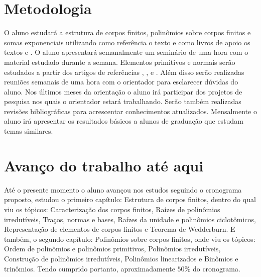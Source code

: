 \documentclass[12pt,twoside]{article}
\begin{document}

  \section*{Metodologia}
    O aluno estudará a estrutura de corpos finitos, polinômios sobre corpos finitos e somas
    exponenciais utilizando como referência o texto \cite[Finite fields]{finite-fields-1997} e como livros 
    de apoio os textos \cite[Abstract algebra]{abstract-algebra-2007} e \cite[Tópicos de álgebra]{topicos-de-algebra-1970}. 
    O aluno apresentará semanalmente um seminário de uma hora com o material estudado durante a semana.
    Elementos primitivos e normais serão estudados a partir dos artigos de referências \cite{article-1987}, 
    \cite{article-2014}, \cite{article-2017} e \cite{article-2018}.
    Além disso serão realizadas reuniões semanais de uma hora com o orientador para esclarecer dúvidas
    do aluno. Nos últimos meses da orientação o aluno irá participar dos projetos de pesquisa nos quais
    o orientador estará trabalhando. Serão também realizadas revisões bibliográficas para acrescentar
    conhecimentos atualizados. Mensalmente o aluno irá apresentar os resultados básicos a alunos de
    graduação que estudam temas similares. \\
    

  \section*{Avanço do trabalho até aqui}
    Até o presente momento o aluno avançou nos estudos seguindo o cronograma proposto, estudou o primeiro capítulo:
    Estrutura de corpos finitos, dentro do qual viu os tópicos: Caracterização dos corpos finitos, Raízes de polinômios
    irredutíveis, Traços, normas e bases, Raízes da unidade e polinômios ciclotômicos, Representação de elementos de
    corpos finitos e Teorema de Wedderburn. E também, o segundo capítulo: Polinômios sobre corpos finitos, onde viu os 
    tópicos: Ordem de polinômios e polinômios primitivos, Polinômios irredutíveis, Construção de polinômios irredutíveis,
    Polinômios linearizados e Binômios e trinômios. Tendo cumprido portanto, aproximadamente $ 50\% $ do cronograma.
    
\end{document}
